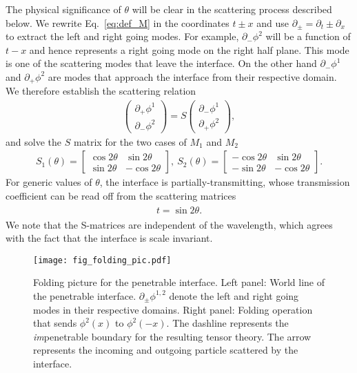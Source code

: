 The physical significance of $\theta$ will be clear in the scattering process described below. We rewrite Eq.~\eqref{eq:def_M} in the coordinates $t\pm x$ and use $\partial_{\pm} = \partial_{t} \pm \partial_x $ to extract the left and right going modes. For example, $\partial_{-} \phi^2$ will be a function of $t - x$ and hence represents a right going mode on the right half plane. This mode is one of the scattering modes that leave the interface. On the other hand $\partial_{-} \phi^1$ and $\partial_{+} \phi^2$ are modes that approach the interface from their respective domain. We therefore establish the scattering relation 
\begin{equation}\begin{aligned}
\label{eq:def_S}
\begin{pmatrix}
\partial_+\phi^1\\
\partial_-\phi^2
\end{pmatrix}
=S
\begin{pmatrix}
\partial_-\phi^1\\
\partial_+\phi^2
\end{pmatrix},
\end{aligned}\end{equation}
and solve the $S$ matrix for the two cases of $M_1$ and $M_2$
\begin{equation}\begin{aligned}
\label{eq:S1_S2}
S_1(\theta)=\begin{bmatrix}
\cos 2\theta & \sin 2\theta \\
\sin 2\theta & -\cos 2\theta
\end{bmatrix},\
S_2(\theta)=\begin{bmatrix}
-\cos 2\theta & \sin 2\theta \\
-\sin 2\theta & -\cos 2\theta
\end{bmatrix}.
\end{aligned}\end{equation}
For generic values of $\theta$, the interface is partially-transmitting, 
{\color{red}whose transmission coefficient
can be read off from the scattering matrices
\begin{eqnarray}\begin{aligned}
t = \sin2\theta.
\end{aligned}\end{eqnarray}
}
We note that the S-matrices are independent of the wavelength, which agrees with the fact that the interface is scale invariant. 
\begin{figure}[h]
\centering
\texttt{[image: fig\_folding\_pic.pdf]}
\caption{Folding picture for the penetrable interface. Left panel: World line of the penetrable interface. $\partial_\pm\phi^{1,2}$ denote the left and right going modes in their respective domains. Right panel: Folding operation that sends $\phi^2(x)$ to $\phi^2(-x)$. The dashline represents the \emph{im}penetrable boundary for the resulting tensor theory. The arrow represents the incoming and outgoing particle scattered by the interface.}
\label{fig:folding_pic}
\end{figure}

